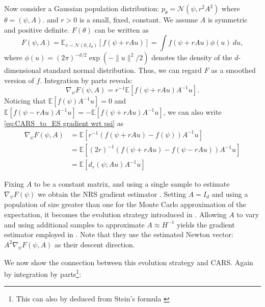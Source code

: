 Now consider a Gaussian population distribution: $p_{\theta} = \mathcal{N}(\psi, r^2 A^2)$ where $\theta = (\psi, A)$. and $r>0$ is a small, fixed, constant. We assume $A$ is symmetric and positive definite. $F(\theta)$ can be written as
\begin{equation*}
    F(\psi, A) = \mathbb{E}_{v \sim \mathcal{N}(0,I_d)}[f(\psi + r Au)]
    = \int f(\psi+r A u) \phi(u)~du,
\end{equation*}
where $\phi(u) = (2\pi)^{-d/2}\exp(-\|u\|^2/2)$ denotes the density of the $d$-dimensional standard normal distribution.
Thus, we can regard $F$ as a smoothed version of $f$. Integration by parts reveals:
\begin{equation}\label{eq:CARS_to_ES gradient wrt psi}
    \nabla_{\psi} F(\psi, A) = r^{-1}\mathbb{E}\left[f(\psi+rAu)A^{-1}u\right].
\end{equation}
Noticing that $\mathbb{E}[f(\psi)A^{-1}u] = 0$ and $\mathbb{E}[f(\psi-r Au)A^{-1}u] = - \mathbb{E}[f(\psi+r Au)A^{-1}u]$, we can also write \eqref{eq:CARS_to_ES gradient wrt psi} as
\begin{align*}
    \nabla_{\psi} F(\psi, A)
     & = \mathbb{E}\left[r^{-1}(f(\psi+r Au) - f(\psi)) A^{-1}u\right]             \\
     & = \mathbb{E}\left[(2r)^{-1}(f(\psi+ r Au) - f(\psi- r Au)) A^{-1}u\right] \\
     & = \mathbb{E}\left[d_r(\psi;Au) A^{-1}u\right]
\end{align*}

Fixing $A$ to be a constant matrix, and using a single sample to estimate $\nabla_\psi F(\psi)$ we obtain the NRS gradient estimator \cite{nesterov2017random}. Setting $A=I_d$ and using a population of size greater than one for the Monte Carlo approximation of the expectation, it becomes the evolution strategy introduced in
\cite{salimans2017evolution}. Allowing $A$ to vary and using additional samples to approximate $A \approx H^{-1}$ yields the gradient estimator employed in \cite{ye2018hessian,shir2020covariance}. Note that they use the estimated Newton vector: $A^{2}\nabla_{\psi}F(\psi,A)$ as their descent direction.

We now show the connection between this evolution strategy and CARS.  Again by integration by parts\footnote{This can also by deduced from Stein's formula \cite{stein1972bound, stein1981estimation}}:

